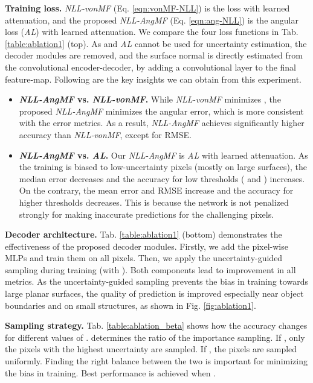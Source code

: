 \documentclass[10pt,twocolumn,letterpaper]{article}
\begin{document}
\noindent
\textbf{Training loss.} \textit{NLL-vonMF} (Eq. \ref{eqn:vonMF-NLL}) is the  loss with learned attenuation, and the proposed \textit{NLL-AngMF} (Eq. \ref{eqn:ang-NLL}) is the angular loss (\textit{AL}) with learned attenuation. We compare the four loss functions in Tab. \ref{table:ablation1} (top). As  and \textit{AL} cannot be used for uncertainty estimation, the decoder modules are removed, and the surface normal is directly estimated from the convolutional encoder-decoder, by adding a  convolutional layer to the final feature-map. Following are the key insights we can obtain from this experiment.

\begin{itemize}
    \item \textbf{\textit{NLL-AngMF} vs. \textit{NLL-vonMF}.} While \textit{NLL-vonMF} minimizes , the proposed \textit{NLL-AngMF} minimizes the angular error, which is more consistent with the error metrics. As a result, \textit{NLL-AngMF} achieves significantly higher accuracy than \textit{NLL-vonMF}, except for RMSE.

    \item \textbf{\textit{NLL-AngMF} vs. \textit{AL}.} Our \textit{NLL-AngMF} is \textit{AL} with learned attenuation. As the training is biased to low-uncertainty pixels (mostly on large surfaces), the median error decreases and the accuracy for low thresholds ( and ) increases. On the contrary, the mean error and RMSE increase and the accuracy for higher thresholds decreases. This is because the network is not penalized strongly for making inaccurate predictions for the challenging pixels.
\end{itemize}

\noindent
\textbf{Decoder architecture.} Tab. \ref{table:ablation1} (bottom) demonstrates the effectiveness of the proposed decoder modules. Firstly, we add the pixel-wise MLPs and train them on all pixels. Then, we apply the uncertainty-guided sampling during training (with ). Both components lead to improvement in all metrics. As the uncertainty-guided sampling prevents the bias in training towards large planar surfaces, the quality of prediction is improved especially near object boundaries and on small structures, as shown in Fig. \ref{fig:ablation1}.

\noindent
\textbf{Sampling strategy.} Tab. \ref{table:ablation_beta} shows how the accuracy changes for different values of .  determines the ratio of the importance sampling. If , only the pixels with the highest uncertainty are sampled. If , the pixels are sampled uniformly. Finding the right balance between the two is important for minimizing the bias in training. Best performance is achieved when . 
\end{document}
